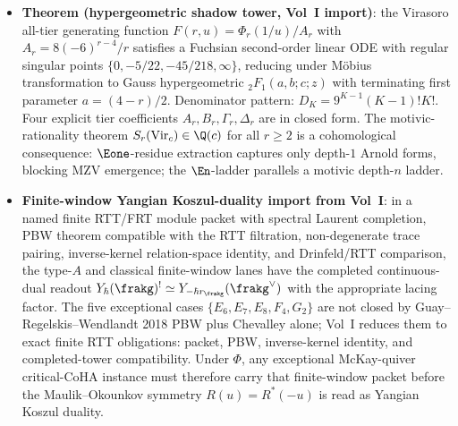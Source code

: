 \begin{itemize}[leftmargin=1.5em,topsep=0.3ex,itemsep=0.5ex]
 is not $\Ainf$-formal as a $(-3)$-CY DG algebra:
 Calaque--Halbout--Felder torus-action formality does not
 apply (only the finite Heisenberg group $H_5$ acts, not
 the continuous torus), and Sheridan's HMS proof for the
 quintic (arXiv:1507.03085) shows $m_3$ is never zero in
 complex-structure moduli. The obstruction is the Yukawa
 coupling
 $Y_3(\mu_1, \mu_2, \mu_3)
 = \int_{X_5} \Omega \wedge
 (\mu_1 \cdot \mu_2 \cdot \mu_3) \lrcorner \Omega$,
 with $Y_3^{\mathrm{cl}} = H^3 = 5$ at large complex
 structure and Gromov--Witten corrections
 $n_1^{(0)} = 2875$, $n_2^{(0)} = 609250$,
 $n_3^{(0)} = 317{,}206{,}375$ (Candelas--de la
 Ossa--Green--Parkes 1991). The correct statement is
 \emph{curved} formality with $Y_3$ as the BCOV curving
 datum.
 \item \textbf{Theorem (hypergeometric shadow tower,
 Vol~I import)}: the Virasoro all-tier generating function
 $F(r, u) = \Phi_r(1/u)/A_r$
 with $A_r = 8(-6)^{r-4}/r$ satisfies a Fuchsian
 second-order linear ODE with regular singular points
 $\{0, -5/22, -45/218, \infty\}$, reducing under Möbius
 transformation to Gauss hypergeometric
 ${}_2 F_1(a, b; c; z)$ with terminating first parameter
 $a = (4 - r)/2$. Denominator pattern:
 $D_K = 9^{K-1} (K-1)! K!$. Four explicit tier coefficients
 $A_r, B_r, \Gamma_r, \Delta_r$ are in closed form. The
 motivic-rationality theorem
 $S_r(\mathrm{Vir}_c) \in \Q(c)$ for all $r \geq 2$ is a
 cohomological consequence: $\Eone$-residue extraction
 captures only depth-$1$ Arnold forms, blocking MZV
 emergence; the $\En$-ladder parallels a motivic
 depth-$n$ ladder.
 \item \textbf{Finite-window Yangian Koszul-duality import
 from Vol~I}: in a named finite RTT/FRT module packet with
 spectral Laurent completion, PBW theorem compatible with the
 RTT filtration, non-degenerate trace pairing, inverse-kernel
 relation-space identity, and Drinfeld/RTT comparison, the
 type-$A$ and classical finite-window lanes have the completed
 continuous-dual readout
 $Y_\hbar(\frakg)^! \simeq Y_{-\hbar r_\frakg}(\frakg^\vee)$
 with the appropriate lacing factor. The five exceptional cases
 $\{E_6, E_7, E_8, F_4, G_2\}$ are not closed by
 Guay--Regelskis--Wendlandt 2018 PBW plus Chevalley alone;
 Vol~I reduces them to exact finite RTT obligations: packet,
 PBW, inverse-kernel identity, and completed-tower compatibility.
 Under $\Phi$, any exceptional McKay-quiver critical-CoHA
 instance must therefore carry that finite-window packet before
 the Maulik--Okounkov symmetry $R(u) = R^*(-u)$ is read as
 Yangian Koszul duality.
\end{itemize}

